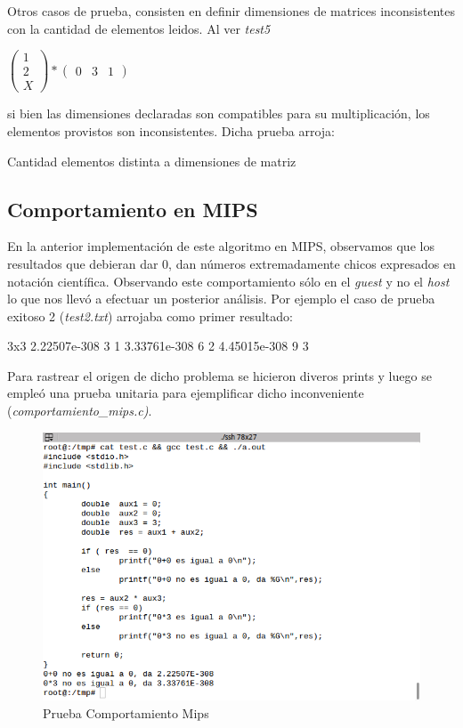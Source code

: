 \documentclass[10pt,a4paper]{article}
\begin{document}
		Otros casos de prueba, consisten en definir dimensiones de matrices inconsistentes con la cantidad de elementos leidos. Al ver \textit{test5}

		

		\begin{center}
		$\begin{pmatrix}
		1 \\ 2 \\ X
		\end{pmatrix}
		*
		\begin{pmatrix}
		0 & 3 & 1
		\end{pmatrix}
		$\end{center}

		si bien las dimensiones declaradas son compatibles para su multiplicación, los elementos provistos son inconsistentes. Dicha prueba arroja:

		\begin{bash}
		Cantidad elementos distinta a dimensiones de matriz
		\end{bash}

	\subsection{Comportamiento en MIPS}\label{sec:MIPS}
		En la anterior implementación de este algoritmo en MIPS, observamos que los resultados que debieran dar 0, dan números extremadamente chicos expresados en notación científica. Observando este comportamiento sólo en el \textit{guest} y no el \textit{host} lo que nos llevó a efectuar un posterior análisis. Por ejemplo el caso de prueba exitoso 2 (\textit{test2.txt}) arrojaba como primer resultado:
		\begin{bash}
		3x3 2.22507e-308 3 1 3.33761e-308 6 2 4.45015e-308 9 3
		\end{bash}

		Para rastrear el origen de dicho problema se hicieron diveros prints y luego se empleó una prueba unitaria para ejemplificar dicho inconveniente (\textit{comportamiento\_mips.c)}. 

		\begin{figure}[h]
			\centering
			\includegraphics[scale=0.45]{images/raro.png}\caption{Prueba Comportamiento Mips}
		\end{figure}
\end{document}
